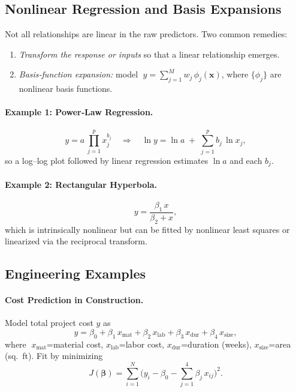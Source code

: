 \documentclass[12pt]{article}
\begin{document}
\subsection{Nonlinear Regression and Basis Expansions}
Not all relationships are linear in the raw predictors.  Two common remedies:
\begin{enumerate}
  \item \emph{Transform the response or inputs} so that a linear relationship emerges.
  \item \emph{Basis‐function expansion:} model
    \(\;y = \sum_{j=1}^M w_j\,\phi_j(\bm{x})\), where \(\{\phi_j\}\) are nonlinear basis functions.
\end{enumerate}

\paragraph{Example 1: Power‐Law Regression.}
\[
  y = a\,\prod_{j=1}^p x_j^{b_j}
  \quad\Longrightarrow\quad
  \ln y = \ln a \;+\;\sum_{j=1}^p b_j\,\ln x_j,
\]
so a log–log plot followed by linear regression estimates \(\ln a\) and each \(b_j\).

\paragraph{Example 2: Rectangular Hyperbola.}
\[
  y
  = 
  \frac{\beta_1\,x}{\beta_2 + x},
\]
which is intrinsically nonlinear but can be fitted by nonlinear least squares or linearized via the reciprocal transform.

\subsection{Engineering Examples}

\paragraph{Cost Prediction in Construction.}  
Model total project cost \(y\) as
\[
  y 
  = 
  \beta_0 
  + \beta_1\,x_{\text{mat}}
  + \beta_2\,x_{\text{lab}}
  + \beta_3\,x_{\text{dur}}
  + \beta_4\,x_{\text{size}},
\]
where
\(\;x_{\text{mat}}\)=material cost,\;
\(x_{\text{lab}}\)=labor cost,\;
\(x_{\text{dur}}\)=duration (weeks),\;
\(x_{\text{size}}\)=area (sq.\ ft).  Fit by minimizing
\[
  J(\boldsymbol{\beta})
  = 
  \sum_{i=1}^N 
    \bigl(
      y_i 
      - 
      \beta_0 
      - 
      \sum_{j=1}^4 \beta_j\,x_{ij}
    \bigr)^2.
\]
\end{document}
